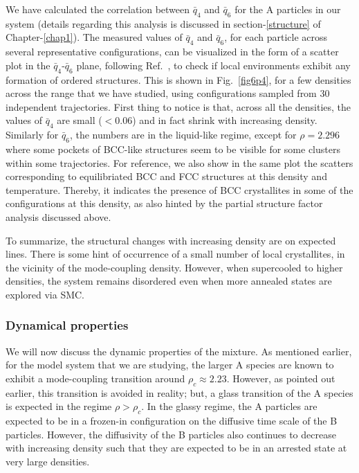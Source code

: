 We have calculated the correlation between $\bar{q}_{4}$ and $\bar{q}_{6}$ for the A particles in our system (details regarding this analysis is discussed in section-\ref{structure} of Chapter-\ref{chap1}). The measured values of $\bar{q}_{4}$ and $\bar{q}_{6}$, for each particle across several representative configurations, can be visualized in the form of a scatter plot in the $\bar{q}_4$-$\bar{q}_6$ plane, following Ref.~\cite{dellago2008}, to check if local environments exhibit any formation of ordered structures. This is shown in Fig.~\ref{fig6p4}, for a few densities across the range that we have studied, using configurations sampled from $30$ independent trajectories. First thing to notice is that, across all the densities, the values of $\bar{q}_4$ are small ($<0.06$) and in fact shrink with increasing density. Similarly for $\bar{q}_6$, the numbers are in the liquid-like regime, except for $\rho=2.296$ where some pockets of BCC-like structures seem to be visible for some clusters within some trajectories. For reference, we also show in the same plot the scatters corresponding to equilibriated BCC and FCC structures at this density and temperature. Thereby, it indicates the presence of BCC crystallites in some of the configurations at this density, as also hinted by the partial structure factor analysis discussed above. 

To summarize, the structural changes with increasing density are on expected lines. There is some hint of occurrence of a small number of local crystallites, in the vicinity of the mode-coupling density. However, when supercooled to higher densities, the system remains disordered even when more annealed states are explored via SMC.

%
\subsubsection{Dynamical properties}
%
We will now discuss the dynamic properties of the mixture.  As mentioned earlier, for the model system that we are studying, the larger A species are known to exhibit a mode-coupling transition around \cite{horbach2009} $\rho_c \approx 2.23$. However, as pointed out earlier, this transition is avoided in reality; but, a glass transition of the A species is expected in the regime $\rho > \rho_c$. In the glassy regime, the A particles are expected to be in a frozen-in configuration on the diffusive time scale of the B particles.  However,  the diffusivity of the B particles also continues to decrease with increasing density such that they are expected to be in an arrested state at very large densities.

